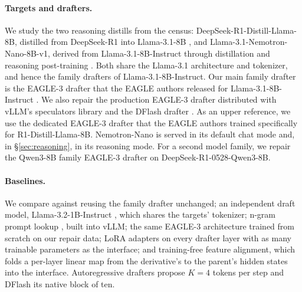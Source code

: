 \documentclass[11pt]{article}
\begin{document}
\paragraph{Targets and drafters.}
We study the two reasoning distills from the census: DeepSeek-R1-Distill-Llama-8B, distilled from DeepSeek-R1 into Llama-3.1-8B \citep{deepseek2025r1}, and Llama-3.1-Nemotron-Nano-8B-v1, derived from Llama-3.1-8B-Instruct through distillation and reasoning post-training \citep{bercovich2025nemotron}.
Both share the Llama-3.1 architecture and tokenizer, and hence the family drafters of Llama-3.1-8B-Instruct.
Our main family drafter is the EAGLE-3 drafter that the EAGLE authors released for Llama-3.1-8B-Instruct \citep{li2025eagle3}.
We also repair the production EAGLE-3 drafter distributed with vLLM's speculators library \citep{redhat2025speculators} and the DFlash drafter \citep{chen2026dflash}.
As an upper reference, we use the dedicated EAGLE-3 drafter that the EAGLE authors trained specifically for R1-Distill-Llama-8B.
Nemotron-Nano is served in its default chat mode and, in \S\ref{sec:reasoning}, in its reasoning mode.
For a second model family, we repair the Qwen3-8B family EAGLE-3 drafter on DeepSeek-R1-0528-Qwen3-8B.

\paragraph{Baselines.}
We compare against reusing the family drafter unchanged; an independent draft model, Llama-3.2-1B-Instruct \citep{llama3herd}, which shares the targets' tokenizer; n-gram prompt lookup \citep{saxena2023pld}, built into vLLM; the same EAGLE-3 architecture trained from scratch on our repair data; LoRA adapters on every drafter layer \citep{hu2022lora} with as many trainable parameters as the interface; and training-free feature alignment, which folds a per-layer linear map from the derivative's to the parent's hidden states into the interface.
Autoregressive drafters propose $K{=}4$ tokens per step and DFlash its native block of ten.
\end{document}
